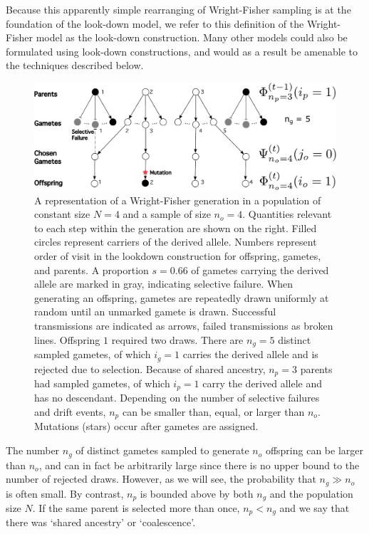 \documentclass[9pt,twocolumn,twoside,lineno]{gsajnl}
\begin{document}
Because this apparently simple rearranging of Wright-Fisher sampling is at the foundation of the look-down model, we refer to this definition of the Wright-Fisher model as the look-down construction. Many other models could also be formulated using look-down constructions, and would as a result be amenable to the techniques described below.   
 \begin{figure}
  \centering
  \includegraphics[width=\columnwidth]{fig/WF_schematic_lookdown.pdf}

 \caption{\label{fig_schematic_gametes}
 A representation of a Wright-Fisher generation in a population of constant size $N=4$ and a sample of size $n_o=4$. Quantities relevant to each step within the generation are shown on the right.  Filled circles represent carriers of the derived allele. Numbers represent order of visit in the lookdown construction for offspring, gametes, and parents. A proportion $s=0.66$ of gametes carrying the derived allele are marked in gray, indicating selective failure. When generating an offspring, gametes are repeatedly drawn uniformly at random until an unmarked gamete is drawn. 
Successful transmissions are indicated as arrows, failed transmissions as broken lines.   
 Offspring $1$ required two draws. There are $n_g=5$ distinct sampled gametes, of which $i_g=1$ carries the derived allele and is rejected due to selection. Because of shared ancestry, $n_p=3$ parents had sampled gametes, of which  $i_p=1$ carry the derived allele and has no descendant.  Depending on the number of selective failures and drift events, $n_p$ can be smaller than, equal, or larger than $n_o$.  Mutations (stars) occur after gametes are assigned.}
\end{figure}
 
The number $n_g$ of distinct gametes sampled to generate $n_o$ offspring can be larger than $n_o$, and can in fact be arbitrarily large since there is no upper bound to the number of rejected draws. However, as we will see, the probability that $n_g \gg n_o$ is often small. 
By contrast, $n_p$ is bounded above by both $n_g$ and the population size $N$. If the same parent is selected more than once, $n_p< n_g$ and we say that there was `shared ancestry' or `coalescence'. 
\end{document}
